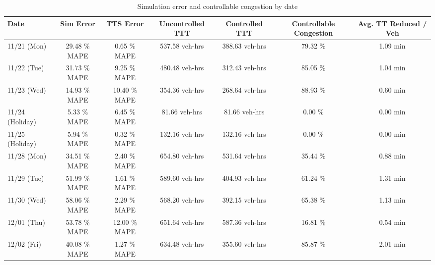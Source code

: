 \begin{table}[ht]
  \centering
  \caption{Simulation error and controllable congestion by date} \label{tab:cc_static}
  \begin{tabular}{lcccccc}
  \hline
  \textbf{Date} & \textbf{Sim Error} & \textbf{TTS Error} & \textbf{Uncontrolled TTT} & \textbf{Controlled TTT} & \textbf{Controllable Congestion} & \textbf{Avg. TT Reduced / Veh} \\
  \hline
  11/21 (Mon) & 29.48 \% MAPE & 0.65 \% MAPE & 537.58 veh-hrs & 388.63 veh-hrs & 79.32 \% & 1.09 min \\
11/22 (Tue) & 31.73 \% MAPE & 9.25 \% MAPE & 480.48 veh-hrs & 312.43 veh-hrs & 85.05 \% & 1.04 min \\
11/23 (Wed) & 14.93 \% MAPE & 10.40 \% MAPE & 354.36 veh-hrs & 268.64 veh-hrs & 88.93 \% & 0.60 min \\
11/24 (Holiday) & 5.33 \% MAPE & 6.45 \% MAPE & 81.66 veh-hrs & 81.66 veh-hrs & 0.00 \% & 0.00 min \\
11/25 (Holiday) & 5.94 \% MAPE & 0.32 \% MAPE & 132.16 veh-hrs & 132.16 veh-hrs & 0.00 \% & 0.00 min \\
11/28 (Mon) & 34.51 \% MAPE & 2.40 \% MAPE & 654.80 veh-hrs & 531.64 veh-hrs & 35.44 \% & 0.88 min \\
11/29 (Tue) & 51.99 \% MAPE & 1.61 \% MAPE & 589.60 veh-hrs & 404.93 veh-hrs & 61.24 \% & 1.31 min \\
11/30 (Wed) & 58.06 \% MAPE & 2.29 \% MAPE & 568.20 veh-hrs & 392.15 veh-hrs & 65.38 \% & 1.13 min \\
12/01 (Thu) & 53.78 \% MAPE & 12.00 \% MAPE & 651.64 veh-hrs & 587.36 veh-hrs & 16.81 \% & 0.54 min \\
12/02 (Fri) & 40.08 \% MAPE & 1.27 \% MAPE & 634.48 veh-hrs & 355.60 veh-hrs & 85.87 \% & 2.01 min \\
  \hline
  \end{tabular} \end{table}

